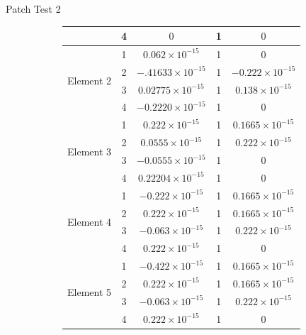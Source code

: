 \documentclass{beamer}
\begin{document}
\begin{frame}[t,fragile]{Patch Test 2}
\begin{figure}
\begin{subfigure}{0.45\textwidth}
{\begin{tabular}{|c|c|c|c|c|}
& 4 & $0$ &1& $0$\\
\hline
\multirow{4}{5em}{Element 2} & 1 & $0.062\times 10^{-15}$ &1& $0$\\
& 2 & $-.41633\times 10^{-15}$ &1& $-0.222\times 10^{-15}$\\
& 3 & $0.02775\times 10^{-15}$ &1& $0.138\times 10^{-15}$\\
& 4 & $-0.2220\times 10^{-15}$ &1& $0$\\
\hline
\multirow{4}{5em}{Element 3} & 1 & $0.222\times 10^{-15}$ &1& $0.1665\times 10^{-15}$\\
& 2 & $0.0555\times 10^{-15}$ &1& $0.222\times 10^{-15}$\\
& 3 & $-0.0555\times 10^{-15}$ &1& $0$\\
& 4 & $0.22204\times 10^{-15}$ &1& $0$\\
\hline
\multirow{4}{5em}{Element 4} & 1 & $-0.222\times 10^{-15}$ &1& $0.1665\times 10^{-15}$\\
& 2 & $0.222\times 10^{-15}$ &1& $0.1665\times 10^{-15}$\\
& 3 & $-0.063\times 10^{-15}$ &1& $0.222\times 10^{-15}$\\
& 4 & $0.222\times 10^{-15}$ &1& $0$\\
\hline
\multirow{4}{5em}{Element 5} & 1 & $-0.422\times 10^{-15}$ &1& $0.1665\times 10^{-15}$\\
& 2 & $0.222\times 10^{-15}$ &1& $0.1665\times 10^{-15}$\\
& 3 & $-0.063\times 10^{-15}$ &1& $0.222\times 10^{-15}$\\
& 4 & $0.222\times 10^{-15}$ &1& $0$\\
\hline
\end{tabular}}
     \end{subfigure}
  \end{figure}
\end{frame}
\end{document}

